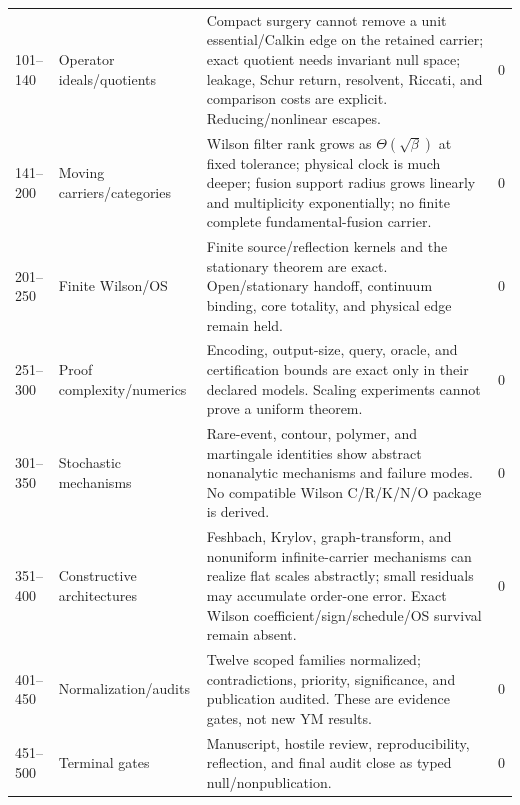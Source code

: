 \documentclass[11pt,oneside]{report}
\theoremstyle{definition}
\theoremstyle{remark}
\begin{document}
\begin{longtable}{p{}p{}p{}p{}}
101--140 & Operator ideals/quotients & Compact surgery cannot remove a unit essential/Calkin edge on the retained carrier; exact quotient needs invariant null space; leakage, Schur return, resolvent, Riccati, and comparison costs are explicit. Reducing/nonlinear escapes. & 0 \\
141--200 & Moving carriers/categories & Wilson filter rank grows as $\Theta(\sqrt\beta)$ at fixed tolerance; physical clock is much deeper; fusion support radius grows linearly and multiplicity exponentially; no finite complete fundamental-fusion carrier. & 0 \\
201--250 & Finite Wilson/OS & Finite source/reflection kernels and the stationary theorem are exact. Open/stationary handoff, continuum binding, core totality, and physical edge remain held. & 0 \\
251--300 & Proof complexity/numerics & Encoding, output-size, query, oracle, and certification bounds are exact only in their declared models. Scaling experiments cannot prove a uniform theorem. & 0 \\
301--350 & Stochastic mechanisms & Rare-event, contour, polymer, and martingale identities show abstract nonanalytic mechanisms and failure modes. No compatible Wilson C/R/K/N/O package is derived. & 0 \\
351--400 & Constructive architectures & Feshbach, Krylov, graph-transform, and nonuniform infinite-carrier mechanisms can realize flat scales abstractly; small residuals may accumulate order-one error. Exact Wilson coefficient/sign/schedule/OS survival remain absent. & 0 \\
401--450 & Normalization/audits & Twelve scoped families normalized; contradictions, priority, significance, and publication audited. These are evidence gates, not new YM results. & 0 \\
451--500 & Terminal gates & Manuscript, hostile review, reproducibility, reflection, and final audit close as typed null/nonpublication. & 0 \\
\bottomrule
\end{longtable}
\normalsize
\end{document}
